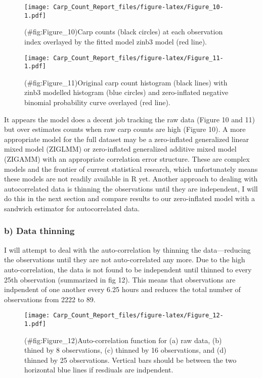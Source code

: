 \documentclass[]{article}
\begin{document}
\begin{figure}[htbp]
\centering
\texttt{[image: Carp\_Count\_Report\_files/figure-latex/Figure\_10-1.pdf]}
\caption{(\#fig:Figure\_10)Carp counts (black circles) at each
observation index overlayed by the fitted model zinb3 model (red line).}
\end{figure}

\begin{figure}[htbp]
\centering
\texttt{[image: Carp\_Count\_Report\_files/figure-latex/Figure\_11-1.pdf]}
\caption{(\#fig:Figure\_11)Original carp count histogram (black lines)
with zinb3 modelled histogram (blue circles) and zero-inflated negative
binomial probability curve overlayed (red line).}
\end{figure}

It appears the model does a decent job tracking the raw data (Figure 10
and 11) but over estimates counts when raw carp counts are high (Figure
10). A more appropriate model for the full dataset may be a
zero-inflated generalized linear mixed model (ZIGLMM) or zero-inflated
generalized additive mixed model (ZIGAMM) with an appropriate
correlation error structure. These are complex models and the frontier
of current statistical research, which unfortunately means these models
are not readily available in R yet. Another approach to dealing with
autocorrelated data is thinning the observations until they are
independent, I will do this in the next section and compare results to
our zero-inflated model with a sandwich estimator for autocorrelated
data.

\subsubsection{b) Data thinning}\label{b-data-thinning}

I will attempt to deal with the auto-correlation by thinning the
data---reducing the observations until they are not auto-correlated any
more. Due to the high auto-correlation, the data is not found to be
independent until thinned to every 25th observation (summarized in fig
12). This means that observations are indpendent of one another every
6.25 hours and reduces the total number of observations from 2222 to 89.

\begin{figure}[htbp]
\centering
\texttt{[image: Carp\_Count\_Report\_files/figure-latex/Figure\_12-1.pdf]}
\caption{(\#fig:Figure\_12)Auto-correlation function for (a) raw data,
(b) thined by 8 observations, (c) thinned by 16 observations, and (d)
thinned by 25 observations. Vertical bars should be between the two
horizontal blue lines if resdiuals are indpendent.}
\end{figure}
\end{document}
